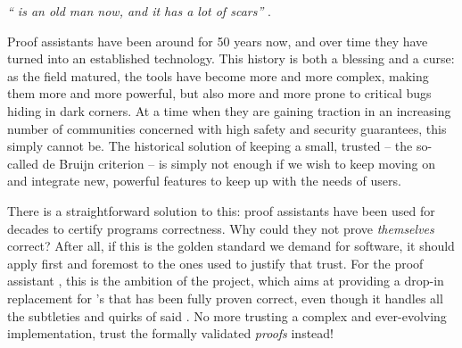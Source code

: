 




\maketitle



\emph{“ is an old man now, and it has a lot of scars”}
\cite[citing Assia Mahboubi]{QuantaPA}.

Proof assistants have been around for 50 years now, and over time they have
turned into an established technology. This history is both a blessing and a curse: as
the field matured, the tools have become more and more complex, making them more and more
powerful, but also more and more prone to critical bugs hiding in dark corners. At a time
when they are gaining traction in an increasing number of communities
concerned with high safety and security guarantees, this simply cannot be.
The historical solution of keeping a small, trusted 
– the so-called de Bruijn criterion –
is  simply not enough if we wish to keep moving on and integrate new, powerful features
to keep up with the needs of users.

There is a straightforward solution to this:
proof assistants have been used for decades to certify programs correctness.
Why could they not prove \emph{themselves} correct? After all, if this is
the golden standard we demand for software, it should apply first and foremost to the ones
used to justify that trust. For the proof assistant ,
this is the ambition of the  project,
which aims at providing a drop-in replacement for ’s  that has been
fully proven correct, even though it handles all the subtleties and quirks of said .
No more trusting a complex and ever-evolving implementation, trust the formally validated
\emph{proofs} instead!

